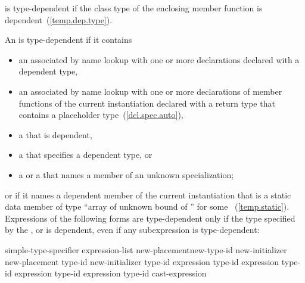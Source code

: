 \pnum
{}
is type-dependent if the class type of the enclosing member function is
dependent~(\ref{temp.dep.type}).

\pnum
An
is type-dependent if it contains

\begin{itemize}
\item
an
associated by name lookup with one or more declarations
declared with a dependent type,

\item
an  associated by name lookup with one or more
declarations of member functions of the current instantiation declared
with a return type that contains a placeholder type~(\ref{dcl.spec.auto}),

\item
a
that is dependent,

\item
a
that specifies a dependent type, or

\item
a
or a
that names a member of an unknown specialization;
\end{itemize}

or if it names a dependent member of the current instantiation that is a static
data member of type
``array of unknown bound of '' for some ~(\ref{temp.static}).
Expressions of the following forms are type-dependent only if the type
specified by the
,
or
is dependent, even if any subexpression is type-dependent:

\begin{ncbnftab}
simple-type-specifier \terminal{(} expression-list\opt \terminal{)}\br
{} new-placement\opt new-type-id new-initializer\opt\br
{} new-placement\opt \terminal{(} type-id \terminal{)} new-initializer\opt\br
{} type-id \terminal{> (} expression \terminal{)}\br
{} type-id \terminal{> (} expression \terminal{)}\br
{} type-id \terminal{> (} expression \terminal{)}\br
{} type-id \terminal{> (} expression \terminal{)}\br
\terminal{(} type-id \terminal{)} cast-expression
\end{ncbnftab}

